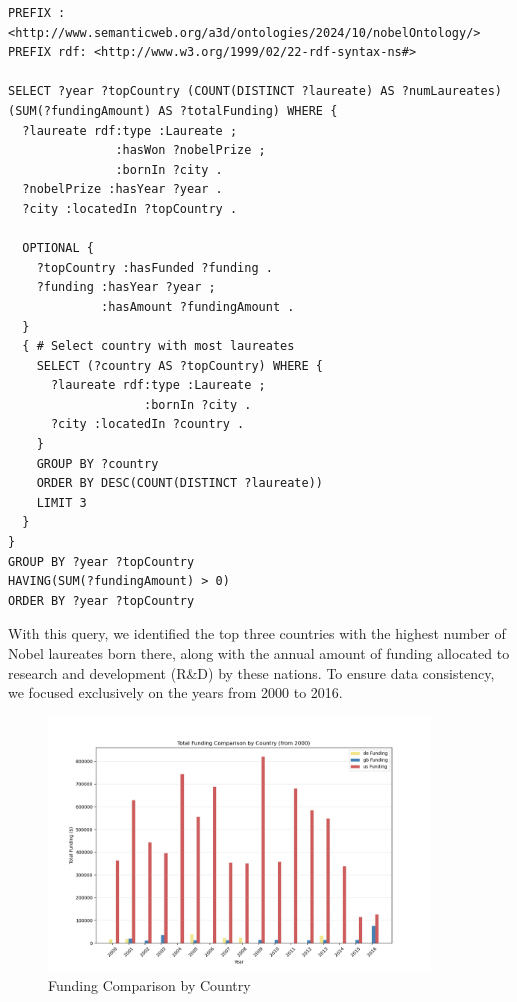 \documentclass{article}
\begin{document}
\begin{lstlisting}
PREFIX : <http://www.semanticweb.org/a3d/ontologies/2024/10/nobelOntology/>
PREFIX rdf: <http://www.w3.org/1999/02/22-rdf-syntax-ns#>

SELECT ?year ?topCountry (COUNT(DISTINCT ?laureate) AS ?numLaureates) (SUM(?fundingAmount) AS ?totalFunding) WHERE {
  ?laureate rdf:type :Laureate ;
  			   :hasWon ?nobelPrize ;
      		   :bornIn ?city .
  ?nobelPrize :hasYear ?year .
  ?city :locatedIn ?topCountry .

  OPTIONAL {
    ?topCountry :hasFunded ?funding .
    ?funding :hasYear ?year ;
     		 :hasAmount ?fundingAmount .
  }
  { # Select country with most laureates
    SELECT (?country AS ?topCountry) WHERE {
      ?laureate rdf:type :Laureate ;
       			   :bornIn ?city .
      ?city :locatedIn ?country .
    }
    GROUP BY ?country
    ORDER BY DESC(COUNT(DISTINCT ?laureate))
    LIMIT 3
  }
}
GROUP BY ?year ?topCountry
HAVING(SUM(?fundingAmount) > 0)
ORDER BY ?year ?topCountry
\end{lstlisting}

\vspace{1em}

With this query, we identified the top three countries with the highest number of Nobel laureates born there, along with the annual amount of funding allocated to research and development (R\&D) by these nations. To ensure data consistency, we focused exclusively on the years from 2000 to 2016.

\begin{figure}[h!]
	\centering
	\includegraphics[width=0.9\textwidth]{../queries/plots/funding_comparison_by_country.png}
	\caption{Funding Comparison by Country}
\end{figure}
\end{document}
